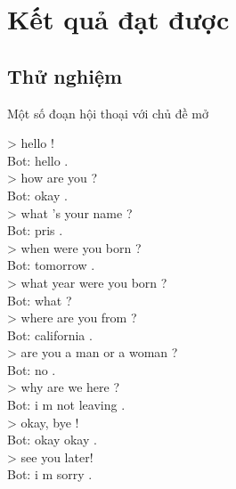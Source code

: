 %
\chapter{Kết quả đạt được}
\label{sec:conclusion}

\section{Thử nghiệm}
Một số đoạn hội thoại với chủ đề mở
\begin{displayquote}
    > hello ! \\
    Bot: hello . \\
    > how are you ? \\
    Bot: okay . \\
    > what ’s your name ? \\
    Bot: pris . \\
    > when were you born ? \\
    Bot: tomorrow . \\
    > what year were you born ? \\
    Bot: what ? \\
    > where are you from ? \\
    Bot: california . \\
    > are you a man or a woman ? \\
    Bot: no . \\
    > why are we here ? \\
    Bot: i m not leaving . \\
    > okay, bye ! \\
    Bot: okay okay . \\
    > see you later! \\
    Bot: i m sorry . \\
\end{displayquote}


